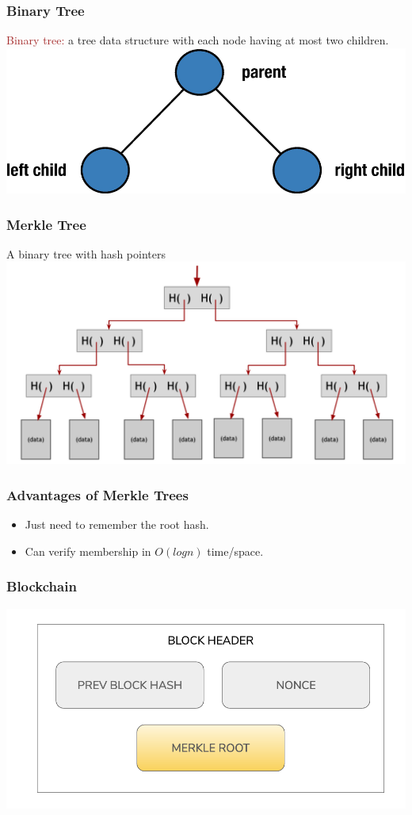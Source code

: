 \documentclass{beamer}
\begin{document}
\begin{frame}
  \frametitle{Binary Tree}
{\Large{\textcolor{brown}{Binary tree:} a tree data structure with each node having at most two children.}} \\ 

	\centering \includegraphics[scale=0.8]{tree} 
\end{frame}
\begin{frame}
  \frametitle{Merkle Tree}
{\Large{A binary tree with hash pointers}} \\

\centering
	\includegraphics[scale=0.5]{tree1}
\end{frame}
\begin{frame}
  \frametitle{Advantages of Merkle Trees}
	\begin{itemize}
		\item Just need to remember the root hash.
		\item Can verify membership in $O(log n)$ time/space.
	\end{itemize}
\end{frame}
\begin{frame}
  \frametitle{Blockchain}
  \centering
	\includegraphics[scale=0.7]{block}
\end{frame}
\end{document}
